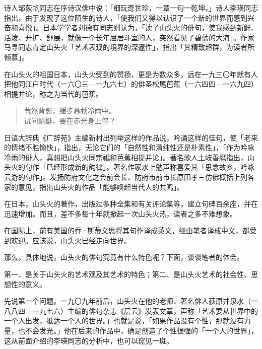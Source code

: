 {    诗人邹荻帆同志在序诗汉俳中说：「细玩奇世珍，一章一句一乾坤。」诗人李瑛同志指出，由于发现了这位陌生的诗人，「使我们又得以认识了一个新的世界而感到兴奋和喜悦」。日本学学者刘德有同志则认为，「读了山头火的俳句，使我感到新鲜、活泼、开扩、舒展，就像一个长年屈居斗室的人，突然看见了碧蓝的大海」。作家马寻同志肯定山头火「艺术表现的境界的深邃性」，指出「其精致超群，为读者所倾慕」。

    在山头火的祖国日本，山头火受到的赞扬，更是为数众多。远在一九三〇年就有人把他同江户时代（一六〇三—一九六七）的俳圣松尾芭蕉（一六四四—一六九四）相提并论，称之为当代的芭蕉。
    \begin{quote}
        茕然背影，缓步暮秋冷雨中。\\
        试问蜻蜓，要在赤光身上停？
    \end{quote}

    日语大辞典《广辞苑》主编新村出列举这样的作品说，吟诵这样的佳句，使「老来的情绪不胜愉快」，指出，无论它们的「自然性和清纯性还是朴素性」，「作为吟咏冷雨的俳人，真想把山头火同宗祗\footnotemark[1]和芭蕉相提并论」。著名歌人土岐善麿指出，山头火的句作「已经形成新的韵律」。著名作家水上勉声称喜爱其「思念故乡，吟咏云游的句作」。发扬防府文化之会前会长、防府市前市长原田孝三仿佛概括上列各家的意见，指出山头火的作品「能够唤起当代人的共鸣」。


    在日本，山头火的著作，出版过多种全集和有关评论集等，建立句碑百余座，并在迅速增加。而且，差不多每十年就掀起一次山头火热，读者之多不难想象。

    在国际上，前有美国的乔·斯蒂文思将其句作译成英文，继由笔者译成中文，都受到欢迎。应该说，山头火巳经走向世界。

    那么，具体地说，山头火的俳句究竟有什么特色呢？下面，谈谈笔者的体会。

    第一、是关于山头火的艺术观及其艺术的特色；第二、是山头火艺术的社会性、思想性的意义。

    先说第一个问题。一九〇九年前后，山头火在他的老师、著名俳人荻原井泉水（一八八四—一九七六）主编的俳句杂志《层云》发表文章，声称「艺术要从世界中的一个人出发，抵达一个人的世界。」\footnotemark[2]也就是说，「如果作品没有个性，那就没有力量，也不会发光。」\footnotemark[3]他在后来的作品中，确是创造了个性很强的「一个人的世界」，这从前面介绍的李瑛同志的分析中，也可以窥见一斑。


}
